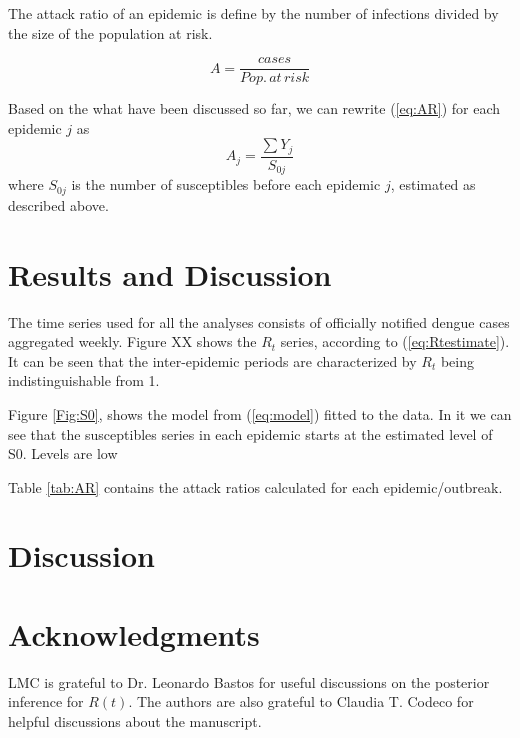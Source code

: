 The attack ratio of an epidemic is define by the number of infections divided 
by the size of the population at risk.

\begin{equation}
\label{eq:AR}
A=\frac{cases}{Pop.\, at\, risk} 
\end{equation}

Based on the what have been discussed so far, we can rewrite (\ref{eq:AR}) for 
each epidemic $j$ as
\begin{equation}
\label{eq:AR2}
 A_{j}=\frac{\sum Y_j}{S_{0j}}
\end{equation}
where $S_{0j}$ is the number of susceptibles before each epidemic $j$, 
estimated as described above.

\section*{Results and Discussion}
 
The time series used for all the analyses consists of officially notified 
dengue cases aggregated weekly. 
Figure XX  shows the $R_t$ series, according to 
(\ref{eq:Rtestimate}). 
It can be seen that the inter-epidemic periods are characterized by $R_t$ being 
indistinguishable from 1.

Figure \ref{Fig:S0}, shows the model from (\ref{eq:model}) fitted to the data. 
In it we can see that the susceptibles series in each epidemic starts at the 
estimated level of S0. Levels are low

Table \ref{tab:AR} contains the attack ratios calculated for each 
epidemic/outbreak.
\section*{Discussion}
\section*{Acknowledgments}
LMC is grateful to Dr. Leonardo Bastos for useful discussions on the 
posterior inference for $R(t)$. The authors are also grateful to Claudia T. 
Codeco for helpful discussions about the manuscript.

